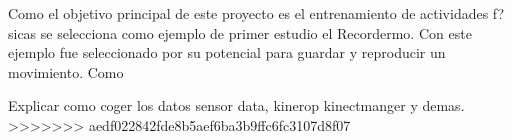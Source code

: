 Como el objetivo principal de este proyecto es el entrenamiento de actividades f?sicas se selecciona como ejemplo de primer estudio el Recordermo. Con este ejemplo fue seleccionado por su potencial para guardar y reproducir un movimiento. Como
 

Explicar como coger los datos sensor data, kinerop kinectmanger y demas.
>>>>>>> aedf022842fde8b5aef6ba3b9ffc6fc3107d8f07
